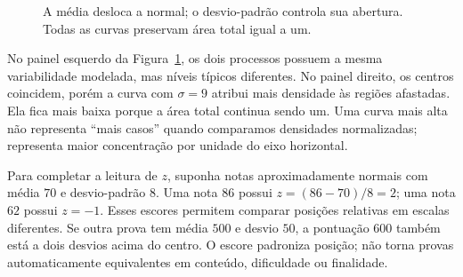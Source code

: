 \begin{figure}[htbp]
\centering
{}
\caption{A média desloca a normal; o desvio-padrão controla sua abertura. Todas as curvas preservam área total igual a um.}
\label{fig:normais-media-dp}
\end{figure}

No painel esquerdo da Figura~\ref{fig:normais-media-dp}, os dois processos possuem a mesma variabilidade modelada, mas níveis típicos diferentes. No painel direito, os centros coincidem, porém a curva com $\sigma=9$ atribui mais densidade às regiões afastadas. Ela fica mais baixa porque a área total continua sendo um. Uma curva mais alta não representa ``mais casos'' quando comparamos densidades normalizadas; representa maior concentração por unidade do eixo horizontal.

Para completar a leitura de $z$, suponha notas aproximadamente normais com média $70$ e desvio-padrão $8$. Uma nota $86$ possui $z=(86-70)/8=2$; uma nota $62$ possui $z=-1$. Esses escores permitem comparar posições relativas em escalas diferentes. Se outra prova tem média $500$ e desvio $50$, a pontuação $600$ também está a dois desvios acima do centro. O escore padroniza posição; não torna provas automaticamente equivalentes em conteúdo, dificuldade ou finalidade.


